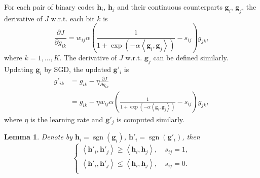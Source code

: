 \documentclass[10pt,twocolumn,letterpaper]{article}
\newtheorem{lemma}{Lemma}
\begin{document}
For each pair of binary codes $\bm{h}_i$, $\bm{h}_j$ and their continuous counterparts $\bm{g}_i$, $\bm{g}_j$, the derivative of $J$ w.r.t. each bit $k$ is
\begin{equation}\label{eqn:gradJ}
\frac{{\partial J}}{{\partial {g_{ik}}}} = w_{ij} \alpha \left( {\frac{1}{{1 + \exp \left( {-\alpha  \left\langle {{\bm{g}}_i, {\bm{g}}_j} \right\rangle } \right)}} - {s_{ij}}} \right){g_{jk}},
\end{equation}
where $k=1,\ldots,K$. The derivative of $J$ w.r.t. $\bm{g}_{j}$ can be defined similarly. Updating ${\bm g}_i$ by SGD, the updated ${{{\bm g}'_i}}$ is
\begin{equation}
\begin{aligned}
{g}'_{ik} & = {{g}}_{ik} - \eta \frac{{\partial J}}{{\partial {{{g}}_{ik}}}} \\
  & = {{g}}_{ik} - \eta w_{ij} \alpha \left( {\frac{1}{{1 + \exp \left( {-\alpha  \left\langle {{\bm{g}}_i, {\bm{g}}_j} \right\rangle } \right)}} - {s_{ij}}} \right){g_{jk}},
\end{aligned}
\end{equation}
where $\eta$ is the learning rate and $\bm{g}'_j$ is computed similarly. 

\begin{lemma}\label{lemma:con}
Denote by ${\bm h}_i = \operatorname{sgn}({\bm g}_i)$, ${\bm h}'_i = \operatorname{sgn}({\bm g}'_i)$, then
\begin{equation}
  \begin{cases}
\left\langle {\bm{h}'_i, \bm{h}'_j} \right\rangle \geqslant \left\langle {{\bm{h}}_i, {\bm{h}}_j} \right\rangle, \quad {s_{ij}} = 1,\\ 
\left\langle {\bm{h}'_i, \bm{h}'_j} \right\rangle \leqslant \left\langle {{\bm{h}}_i, {\bm{h}}_j} \right\rangle, \quad {s_{ij}} = 0.\\
  \end{cases}
  \end{equation}
\end{lemma}
\end{document}
